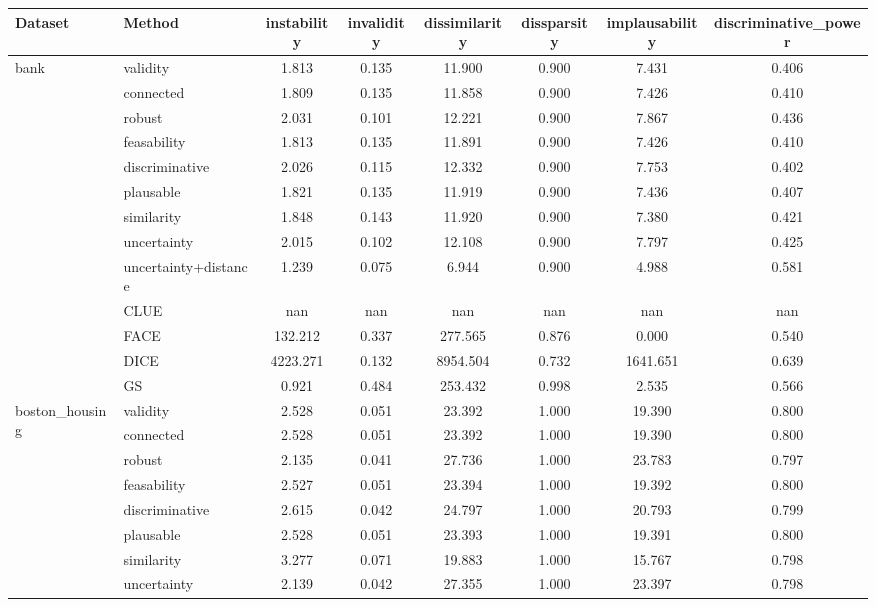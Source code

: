 \begin{table}[ht]
\centering
\begin{tabular}{l l c c c c c c}
\hline
Dataset & Method & instability & invalidity & dissimilarity & dissparsity & implausability & discriminative_power \\ 
\hline
\multirow{13}{*}{bank} & validity & 1.813 & 0.135 & 11.900 & 0.900 & 7.431 & 0.406 \\ 
 & connected & 1.809 & 0.135 & 11.858 & 0.900 & 7.426 & 0.410 \\ 
 & robust & 2.031 & 0.101 & 12.221 & 0.900 & 7.867 & 0.436 \\ 
 & feasability & 1.813 & 0.135 & 11.891 & 0.900 & 7.426 & 0.410 \\ 
 & discriminative & 2.026 & 0.115 & 12.332 & 0.900 & 7.753 & 0.402 \\ 
 & plausable & 1.821 & 0.135 & 11.919 & 0.900 & 7.436 & 0.407 \\ 
 & similarity & 1.848 & 0.143 & 11.920 & 0.900 & 7.380 & 0.421 \\ 
 & uncertainty & 2.015 & 0.102 & 12.108 & 0.900 & 7.797 & 0.425 \\ 
 & uncertainty+distance & 1.239 & 0.075 & 6.944 & 0.900 & 4.988 & 0.581 \\ 
 & CLUE & nan & nan & nan & nan & nan & nan \\ 
 & FACE & 132.212 & 0.337 & 277.565 & 0.876 & 0.000 & 0.540 \\ 
 & DICE & 4223.271 & 0.132 & 8954.504 & 0.732 & 1641.651 & 0.639 \\ 
 & GS & 0.921 & 0.484 & 253.432 & 0.998 & 2.535 & 0.566 \\ 
\hline
\multirow{13}{*}{boston_housing} & validity & 2.528 & 0.051 & 23.392 & 1.000 & 19.390 & 0.800 \\ 
 & connected & 2.528 & 0.051 & 23.392 & 1.000 & 19.390 & 0.800 \\ 
 & robust & 2.135 & 0.041 & 27.736 & 1.000 & 23.783 & 0.797 \\ 
 & feasability & 2.527 & 0.051 & 23.394 & 1.000 & 19.392 & 0.800 \\ 
 & discriminative & 2.615 & 0.042 & 24.797 & 1.000 & 20.793 & 0.799 \\ 
 & plausable & 2.528 & 0.051 & 23.393 & 1.000 & 19.391 & 0.800 \\ 
 & similarity & 3.277 & 0.071 & 19.883 & 1.000 & 15.767 & 0.798 \\ 
 & uncertainty & 2.139 & 0.042 & 27.355 & 1.000 & 23.397 & 0.798 \\ 

\end{tabular}
\end{table}
